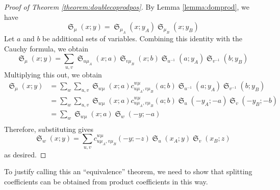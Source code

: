 \documentclass[reqno]{amsart}
\newtheorem{corollary}[lemma]{Corollary}
\theoremstyle{definition}
\theoremstyle{remark}
\numberwithin{equation}{subsection}
\DeclareMathOperator{\sch}{\mathfrak{S}}
\begin{document}
\begin{proof}[Proof of Theorem \ref{theorem:doublecoprodpos}]
By Lemma \ref{lemma:domprod}, we have
$$\sch_\mu(x;y)=\sch_{\mu_A}(x;y_A)\sch_{\mu_B}(x;y_B)$$
Let $a$ and $b$ be additional sets of variables. Combining this identity with the Cauchy formula, we obtain
$$\sch_\mu(x;y)=\sum_{u,v}\sch_{u\mu_A}(x;a)\sch_{v\mu_B}(x;b)\sch_{u^{-1}}(a;y_A)\sch_{v^{-1}}(b;y_B)$$
Multiplying this out, we obtain
\begin{align*}
\sch_\mu(x;y)&=\sum_w\sum_{u,v}\sch_{w\mu}(x;a)c_{u\mu_A,v\mu_B}^{w\mu}(a;b)\sch_{u^{-1}}(a;y_A)\sch_{v^{-1}}(b;y_B)\\
             &=\sum_w\sum_{u,v}\sch_{w\mu}(x;a)c_{u\mu_A,v\mu_B}^{w\mu}(a;b)\sch_{u}(-y_A;-a)\sch_{v}(-y_B;-b)\\
						 &=\sum_w\sch_{w\mu}(x;a)\sch_{w}(-y;-a)\\
\end{align*}
Therefore, substituting gives
$$\sch_w(x;y)=\sum_{u,v}c_{u\mu_A,v\mu_B}^{w\mu}(-y;-z)\sch_u(x_A;y)\sch_v(x_B;z)$$
as desired.
\end{proof}




To justify calling this an ``equivalence'' theorem, we need to show that splitting coefficients can be obtained from product coefficients in this way.
\end{document}
